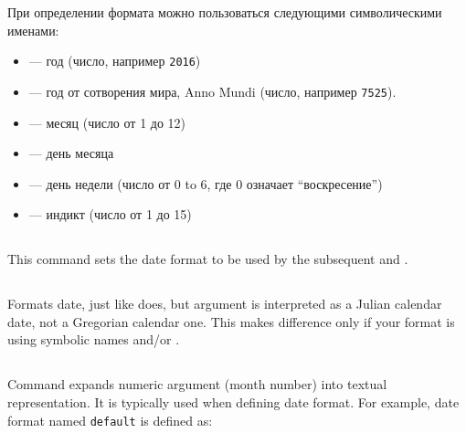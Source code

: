 \begin{RU}
При определении формата можно пользоваться следующими символическими именами:
\begin{itemize}
\item {} --- год (число, например \texttt{2016})
\item {}\footnotemark[1] --- год от сотворения мира, Anno Mundi (число, например \texttt{7525}).
\item {} --- месяц (число от 1 до 12)
\item {} --- день месяца
\item {}\footnotemark[1] --- день недели (число от 0 to 6, где 0 означает ``воскресение'')
\item {} --- индикт (число от 1 до 15)
\end{itemize}
\end{RU}

\begin{EN}
\subsection{}
This command sets the date format to be used by the subsequent  and .

\subsection{}
Formats date, just like  does, but argument is interpreted as a Julian calendar date, not a Gregorian calendar one.
This makes difference only if your format is using symbolic names  and/or .

\subsection{}
Command expands numeric argument (month number) into textual representation. It is typically used when defining date format.
For example, date format named \texttt{default} is defined as:
\end{EN}

